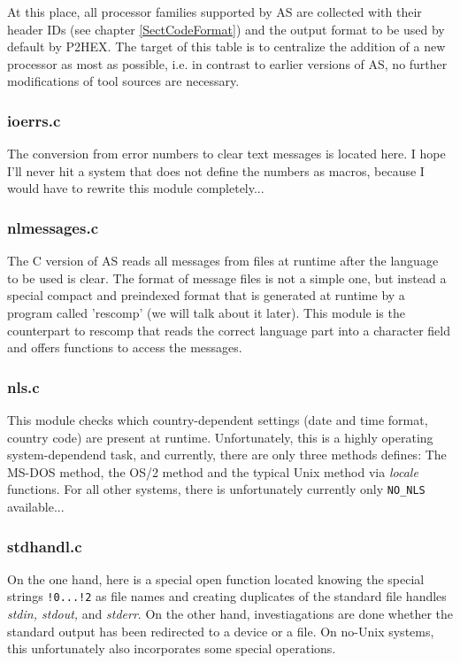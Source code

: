 \documentclass[12pt,twoside]{report}
\begin{document}
At this place, all processor families supported by AS are collected with
their header IDs (see chapter \ref{SectCodeFormat}) and the output format
to be used by default by P2HEX.  The target of this table is to centralize
the addition of a new processor as most as possible, i.e. in contrast to
earlier versions of AS, no further modifications of tool sources are
necessary.

\subsubsection{ioerrs.c}

The conversion from error numbers to clear text messages is located here.
I hope I'll never hit a system that does not define the numbers as macros,
because I would have to rewrite this module completely...

\subsubsection{nlmessages.c}

The C version of AS reads all messages from files at runtime after the
language to be used is clear.  The format of message files is not a simple
one, but instead a special compact and preindexed format that is generated
at runtime by a program called 'rescomp' (we will talk about it later).
This module is the counterpart to rescomp that reads the correct language
part into a character field and offers functions to access the messages.

\subsubsection{nls.c}

This module checks which country-dependent settings (date and time format,
country code) are present at runtime.  Unfortunately, this is a highly
operating system-dependend task, and currently, there are only three
methods defines: The MS-DOS method, the OS/2 method and the typical Unix
method via {\em locale} functions.  For all other systems, there is
unfortunately currently only \verb!NO_NLS! available...

\subsubsection{stdhandl.c}

On the one hand, here is a special open function located knowing the
special strings {\tt !0...!2} as file names and creating duplicates of the
standard file handles {\em stdin, stdout,} and {\em stderr}.  On the other
hand, investiagations are done whether the standard output has been
redirected to a device or a file.  On no-Unix systems, this unfortunately
also incorporates some special operations.
\end{document}
